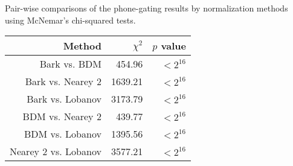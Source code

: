 Pair-wise comparisons of the phone-gating results by normalization methods using 
	McNemar's chi-squared tests.\\
	\centering
	\begin{tabular}{rrr}
 \hline
 \rowcolor[gray]{.75}
 \textbf{Method} & $\chi^2$ &  \textbf{$p$ value}\\ 
		\hline
		Bark vs. BDM & 454.96 & $<2^{16}$ \\ 
		Bark vs. Nearey 2 & 1639.21 &$<2^{16}$\\ 
		Bark vs. Lobanov & 3173.79 &$<2^{16}$\\ 
		BDM vs. Nearey 2 & 439.77 &$<2^{16}$\\ 
		BDM vs. Lobanov & 1395.56 &$<2^{16}$\\ 
		Nearey 2 vs. Lobanov & 3577.21 &$<2^{16}$ \\ 
		\hline
	\end{tabular}
